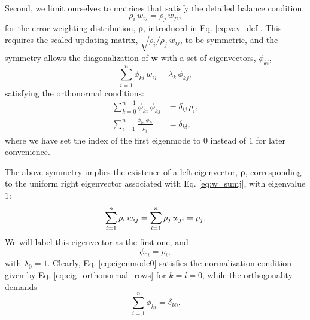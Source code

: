 \documentclass[reprint, superscriptaddress, floatfix]{revtex4-1}
\begin{document}
Second, we limit ourselves to matrices %
that satisfy
the detailed balance condition,
%
\begin{equation}
  \rho_i \, w_{ij} = \rho_j \, w_{ji}
  ,
  \label{eq:w_detailedbalance}
\end{equation}
%
for the error weighting distribution, $\pmb \rho$,
introduced in Eq. \eqref{eq:vav_def}.
%
This requires the scaled updating matrix,
$\sqrt{ \rho_i/\rho_j } \, w_{ij}$,
to be symmetric,
and the symmetry allows the diagonalization
of $\mathbf w$ with a set of
eigenvectors, $\phi_{ki}$,
%
\begin{equation}
  \sum_{i = 1}^n \phi_{ki} \, w_{ij}
  =
  \lambda_k \, \phi_{kj}
  ,
\label{eq:eig_w}
\end{equation}
%
satisfying the orthonormal conditions\cite{vankampen}:
%
\begin{align}
  \sum_{k = 0}^{n - 1}
    \phi_{ki} \, \phi_{kj}
  &=
  \delta_{ij} \, \rho_i,
  \label{eq:eig_orthonormal_cols}
  \\
  \sum_{i = 1}^n
    \frac{ \phi_{ki} \, \phi_{li} }
         { \rho_i }
  &=
  \delta_{kl}
  ,
  \label{eq:eig_orthonormal_rows}
\end{align}
%
where we have set the index of the first eigenmode to $0$
instead of $1$ for later convenience.

The above symmetry implies the existence of
a left eigenvector, $\pmb \rho$,
corresponding to the uniform right eigenvector
associated with Eq. \eqref{eq:w_sumj},
with eigenvalue $1$:
%
\begin{equation}
  \sum_{i = 1}^n \rho_i \, w_{ij}
  =
  \sum_{i = 1}^n \rho_j \, w_{ji}
  =
  \rho_j
  .
  \notag
\end{equation}
%
We will label this eigenvector as the first one,
and
%
\begin{equation}
  \phi_{0i} = \rho_i,
\label{eq:eigenmode0}
\end{equation}
%
with $\lambda_0 = 1$.
%
Clearly, Eq. \eqref{eq:eigenmode0}
satisfies the normalization condition
given by Eq. \eqref{eq:eig_orthonormal_rows}
for $k = l = 0$,
while the orthogonality demands
%
\begin{equation}
  \sum_{ i = 1 }^n \phi_{ki}
  =
  \delta_{k0}
  .
\label{eq:ortho1}
\end{equation}
%
\end{document}
